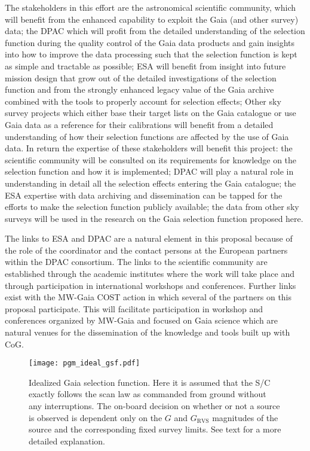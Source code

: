 The stakeholders in this effort are the astronomical scientific community, which will benefit from the enhanced capability to exploit the Gaia (and other survey) data; the DPAC which will profit from the detailed understanding of the selection function during the quality control of the Gaia data products and gain insights into how to improve the data processing such that the selection function is kept as simple and tractable as possible; ESA will benefit from insight into future mission design that grow out of the detailed investigations of the selection function and from the strongly enhanced legacy value of the Gaia archive combined with the tools to properly account for selection effects; Other sky survey projects which either base their target lists on the Gaia catalogue or use Gaia data as a reference for their calibrations will benefit from a detailed understanding of how their selection functions are affected by the use of Gaia data. In return the expertise of these stakeholders will benefit this project: the scientific community will be consulted on its requirements for knowledge on the selection function and how it is implemented; DPAC will play a natural role in understanding in detail all the selection effects entering the Gaia catalogue; the ESA expertise with data archiving and dissemination can be tapped for the efforts to make the selection function publicly available; the data from other sky surveys will be used in the research on the Gaia selection function proposed here.

The links to ESA and DPAC are a natural element in this proposal because of the role of the coordinator and the contact persons at the European partners within the DPAC consortium. The links to the scientific community are established through the academic institutes where the work will take place and through participation in international workshops and conferences. Further links exist with the MW-Gaia COST action in which several of the partners on this proposal participate. This will facilitate participation in workshop and conferences organized by MW-Gaia and focused on Gaia science which are natural venues for the dissemination of the knowledge and tools built up with CoG.

\begin{figure}[t]
    \centering
    \texttt{[image: pgm\_ideal\_gsf.pdf]}
    \caption{Idealized Gaia selection function. Here it is assumed that the S/C exactly follows the scan law as commanded from ground without any interruptions. The on-board decision on whether or not a source is observed is dependent only on the $G$ and $G_\mathrm{RVS}$ magnitudes of the source and the corresponding fixed survey limits. See text for a more detailed explanation.}
    \label{fig:gsf_ideal}
\end{figure}

